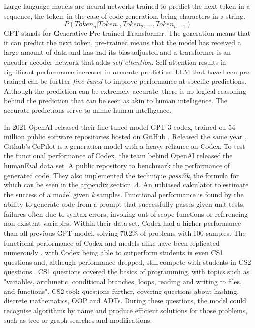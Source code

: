\documentclass[manuscript,screen,review,sigconf]{acmart}
\begin{document}
Large language models are neural networks trained to predict the next token in a sequence, the token, in the case of code generation, being characters in a string.
\[P(Token_n|Token_1,Token_2,...,Token_{n-1})\]
GPT stands for \textbf{G}enerative \textbf{P}re-trained \textbf{T}ransformer. The generation means that it can predict the next token, pre-trained means that the model has received a large amount of data and has had its bias adjusted and a transformer is an encoder-decoder network that adds \textit{self-attention}. Self-attention results in significant performance increases in accurate prediction. LLM that have been pre-trained can be further \textit{fine-tuned} to improve performance at specific predictions. Although the prediction can be extremely accurate, there is no logical reasoning behind the prediction that can be seen as akin to human intelligence. The accurate predictions serve to mimic human intelligence.


In 2021 OpenAI released their fine-tuned model GPT-3 codex, trained on 54 million public software repositories hosted on GitHub \cite{CodexRelPaper}. Released the same year \cite{GitHub_2021}, Github's CoPilot is a generation model with a heavy reliance on Codex. To test the functional performance of Codex, the team behind OpenAI released the humanEval data set. A public repository to benchmark the performance of generated code. They also implemented the technique \textit{pass@k}, the formula for which can be seen in the appendix section .4. An unbiased calculator to estimate the success of a model given \textit{k} samples. Functional performance is found by the ability to generate code from a prompt that successfully passes given unit tests, failures often due to syntax errors, invoking out-of-scope functions or referencing non-existent variables. Within their data set, Codex had a higher performance than all previous GPT-model, solving 70.2\% of problems with 100 samples. The functional performance of Codex and models alike have been replicated numerously \cite{SysEvaOfLLMofCode, PerformanceParsonProblems, CopilotSuggestionsEval, CoPilotForTeaching}, with Codex being able to outperform students in even CS1 questions and, although performance dropped, still compete with students in CS2 questions \cite{Codex_CS1_CS2_Test}. CS1 questions covered the basics of programming, with topics such as "variables, arithmetic, conditional branches, loops, reading and writing to files, and functions". CS2 took questions further, covering questions about hashing, discrete mathematics, OOP and ADTs. During these questions, the model could recognise algorithms by name and produce efficient solutions for those problems, such as tree or graph searches and modifications.
\end{document}
